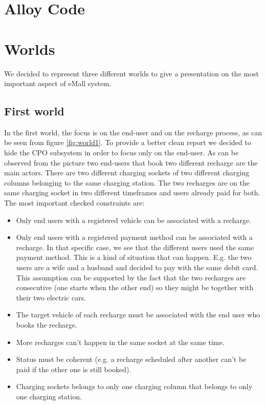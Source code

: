 \documentclass[a4paper]{report}
\begin{document}
\section{Alloy Code}


\section{Worlds}
We decided to represent three different worlds to give a presentation on the most important aspect of eMall system.

\subsection{First world}
In the first world, the focus is on the end-user and on the recharge process, as can be seen from figure \ref{fig:world1}. To provide a better clean report we decided to hide the CPO subsystem in order to focus only on the end-user. As can be observed from the picture two end-users that book two different recharge are the main actors. There are two different charging sockets of two different charging columns belonging to the same charging station. The two recharges are on the same charging socket in two different timeframes and users already paid for both. The most important checked constraints are:
\begin{itemize}
    \item Only end users with a registered vehicle can be associated with a recharge.
    \item Only end users with a registered payment method can be associated with a recharge. In that specific case, we see that the different users used the same payment method. This is a kind of situation that can happen. E.g. the two users are a wife and a husband and decided to pay with the same debit card. This assumption can be supported by the fact that the two recharges are consecutive (one starts when the other end) so they might be together with their two electric cars.
    \item The target vehicle of each recharge must be associated with the end user who books the recharge.
    \item More recharges can't happen in the same socket at the same time.
    \item Status must be coherent (e.g. a recharge scheduled after another can't be paid if the other one is still booked).
    \item Charging sockets belongs to only one charging column that belongs to only one charging station.
\end{itemize}
\end{document}
